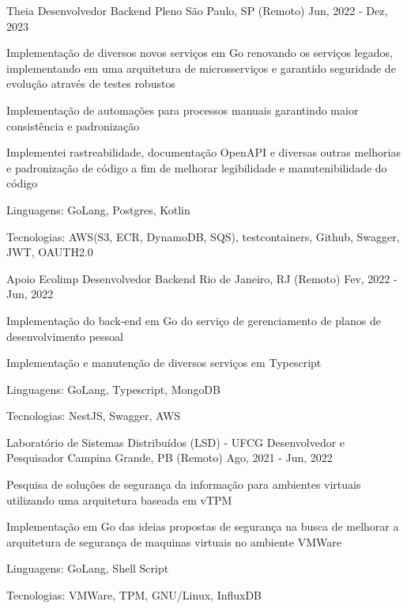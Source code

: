
\begin{cventries}
  \cventry
  {Theia} %
  {Desenvolvedor Backend Pleno} %
  {São Paulo, SP (Remoto)} %
  {Jun, 2022 - Dez, 2023} %
  {
    \begin{cvitems} %
      \item {Implementação de diversos novos serviços em Go renovando os serviços legados, implementando em uma arquitetura de microsserviços e garantido seguridade de evolução através de testes robustos}
      \item {Implementação de automações para processos manuais garantindo maior consistência e padronização}
      \item {Implementei rastreabilidade, documentação OpenAPI e diversas outras melhorias e padronização de código a fim de melhorar legibilidade e manutenibilidade do código }
      \item {Linguagens: GoLang, Postgres, Kotlin}
      \item {Tecnologias: AWS(S3, ECR, DynamoDB, SQS), testcontainers, Github, Swagger, JWT, OAUTH2.0}
    \end{cvitems}
  }

  \cventry
  {Apoio Ecolimp} %
  {Desenvolvedor Backend} %
  {Rio de Janeiro, RJ (Remoto)} %
  {Fev, 2022 - Jun, 2022} %
  {
    \begin{cvitems} %
      \item {Implementação do back-end em Go do serviço de gerenciamento de planos de desenvolvimento pessoal}
      \item {Implementação e manutenção de diversos serviços em Typescript}
      \item {Linguagens: GoLang, Typescript, MongoDB}
      \item {Tecnologias: NestJS, Swagger, AWS}
    \end{cvitems}
  }

  \cventry
  {Laboratório de Sistemas Distribuídos (LSD) - UFCG} %
  {Desenvolvedor e Pesquisador} %
  {Campina Grande, PB (Remoto)} %
  {Ago, 2021 - Jun, 2022} %
  {
    \begin{cvitems} %
      \item {Pesquisa de soluções de segurança da informação para ambientes virtuais utilizando uma arquitetura baseada em vTPM}
      \item {Implementação em Go das ideias propostas de segurança na busca de melhorar a arquitetura de segurança de maquinas virtuais no ambiente VMWare}
      \item {Linguagens: GoLang, Shell Script}
      \item {Tecnologias: VMWare, TPM, GNU/Linux, InfluxDB}
    \end{cvitems}
  }


\end{cventries}

